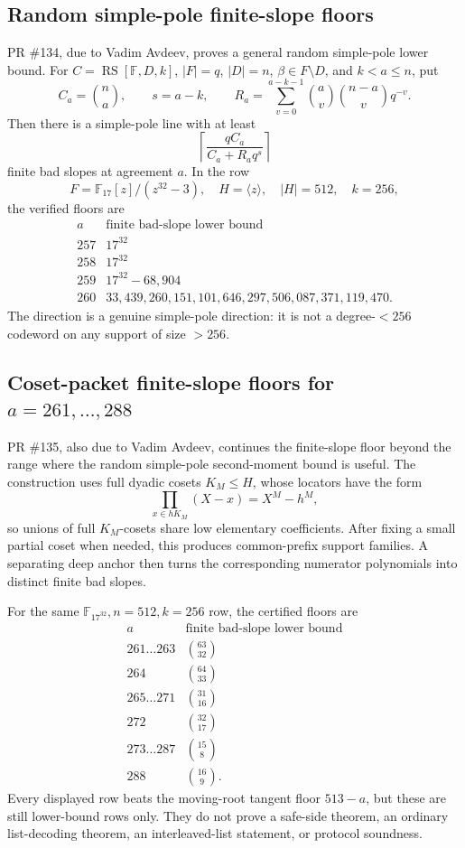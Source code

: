 \documentclass[11pt]{article}
\newcommand{\F}{\mathbb F}
\newcommand{\RS}{\operatorname{RS}}
\begin{document}
\subsection{Random simple-pole finite-slope floors}

PR \#134, due to Vadim Avdeev, proves a general random simple-pole lower bound.
For \(C=\RS[\F,D,k]\), \(|F|=q\), \(|D|=n\), \(\beta\in F\setminus D\), and
\(k<a\le n\), put
\[
  C_a=\binom{n}{a},\qquad s=a-k,\qquad
  R_a=\sum_{v=0}^{a-k-1}
        \binom{a}{v}\binom{n-a}{v}q^{-v}.
\]
Then there is a simple-pole line with at least
\[
  \left\lceil
    \frac{qC_a}{C_a+R_aq^s}
  \right\rceil
\]
finite bad slopes at agreement \(a\).  In the row
\[
  F=\F_{17}[z]/(z^{32}-3),\quad H=\langle z\rangle,\quad |H|=512,\quad k=256,
\]
the verified floors are
\[
\begin{array}{c|c}
a & \text{finite bad-slope lower bound}\\
\hline
257 & 17^{32}\\
258 & 17^{32}\\
259 & 17^{32}-68{,}904\\
260 & 33{,}439{,}260{,}151{,}101{,}646{,}297{,}506{,}087{,}371{,}119{,}470 .
\end{array}
\]
The direction is a genuine simple-pole direction: it is not a degree-\(<256\)
codeword on any support of size \(>256\).

\subsection{Coset-packet finite-slope floors for \(a=261,\ldots,288\)}

PR \#135, also due to Vadim Avdeev, continues the finite-slope floor beyond the
range where the random simple-pole second-moment bound is useful.  The
construction uses full dyadic cosets \(K_M\le H\), whose locators have the form
\[
  \prod_{x\in hK_M}(X-x)=X^M-h^M,
\]
so unions of full \(K_M\)-cosets share low elementary coefficients.  After
fixing a small partial coset when needed, this produces common-prefix support
families.  A separating deep anchor then turns the corresponding numerator
polynomials into distinct finite bad slopes.

For the same \(\F_{17^{32}},n=512,k=256\) row, the certified floors are
\[
\begin{array}{c|c}
a & \text{finite bad-slope lower bound}\\
\hline
261\ldots263 & \binom{63}{32}\\
264 & \binom{64}{33}\\
265\ldots271 & \binom{31}{16}\\
272 & \binom{32}{17}\\
273\ldots287 & \binom{15}{8}\\
288 & \binom{16}{9}.
\end{array}
\]
Every displayed row beats the moving-root tangent floor \(513-a\), but these
are still lower-bound rows only.  They do not prove a safe-side theorem, an
ordinary list-decoding theorem, an interleaved-list statement, or protocol
soundness.
\end{document}
